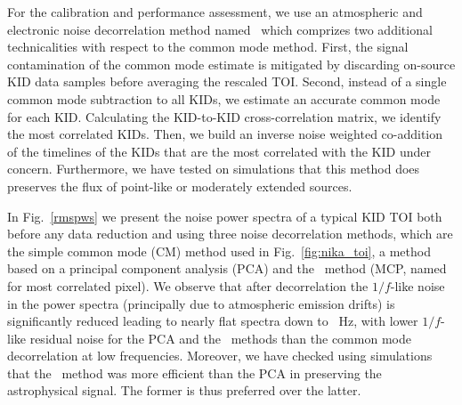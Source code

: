 {\lp For the calibration and performance assessment, we use an
atmospheric and electronic noise
decorrelation method named \cmoneb\, which comprizes two
additional technicalities with respect to the common mode
method.} First, the signal contamination of the common mode estimate
is mitigated by discarding on-source KID data samples before averaging
the rescaled TOI. Second, instead of a single common mode subtraction to
all KIDs, we estimate an accurate common mode for each
KID. Calculating the KID-to-KID cross-correlation matrix, we
identify the most correlated KIDs. Then, we build an
inverse noise weighted co-addition of the timelines of the %
KIDs that are the most correlated with the KID under
concern. Furthermore, we have tested on simulations that this method
does preserves the flux of {\lp point-like or moderately extended sources.}

In Fig.~\ref{rmspws} we present the noise power spectra of
a typical KID TOI both before any data reduction and using three noise
decorrelation methods, which are the simple common mode (CM) method
used in Fig.~\ref{fig:nika_toi}, a method based on a principal component
analysis (PCA) and the \cmoneb\ method (MCP, named for most correlated
pixel). We observe that after decorrelation the
$1/f$-like noise in the power spectra (principally due to atmospheric
emission drifts)
is significantly reduced leading to nearly flat spectra down to {~Hz}, with
lower $1/f$-like residual noise for the PCA and the \cmoneb\ methods
than the common mode decorrelation at low frequencies. {\lp Moreover, we
have checked using simulations that the \cmoneb\ method was more
efficient than the PCA in preserving the astrophysical signal. The
former is thus preferred over the latter.}\\ 


